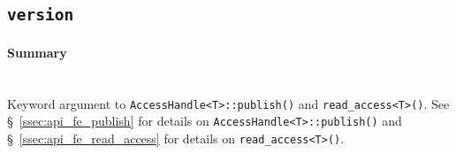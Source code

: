 \subsection{\texttt{version}}
\label{ssec:api_fe_version}

\paragraph{Summary}\mbox{}\\ 
Keyword argument to \texttt{AccessHandle<T>::publish()} and
\texttt{read_access<T>()}.  See \S~\ref{ssec:api_fe_publish} for details on
\texttt{AccessHandle<T>::publish()} and \S~\ref{ssec:api_fe_read_access} for
details on \texttt{read_access<T>()}.


%
%
%
%



